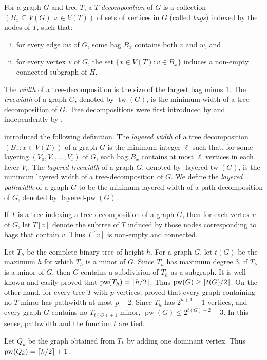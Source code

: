 \documentclass[a4paper,11pt]{article}
\newcommand{\ceil}[1]{\ensuremath{\protect\lceil#1\rceil}}
\DeclareMathOperator{\tw}{tw}
\DeclareMathOperator{\pw}{pw}
\DeclareMathOperator{\pb}{layered-pw}
\DeclareMathOperator{\tb}{layered-tw}
\theoremstyle{plain}
\theoremstyle{definition}
\begin{document}
For a graph $G$ and tree $T$, a $T$-\emph{decomposition} of  $G$ is a collection $(B_x\subseteq V(G):x\in V(T))$ of sets of vertices in $G$ (called  \emph{bags}) indexed by the nodes of $T$, such that:
\begin{enumerate}[(i)]
\item for every edge $vw$ of $G$, some bag $B_x$ contains both $v$ and $w$, and 
\item for every vertex $v$ of $G$, the set $\{x\in V(T):v\in B_x\}$ induces a non-empty connected subgraph of $H$.
\end{enumerate}
The \emph{width} of a tree-decomposition is the size of the largest bag minus 1. The \emph{treewidth} of a graph $G$, denoted by $\tw(G)$, is the minimum width of a tree decomposition of $G$. Tree decompositions were first introduced by \citet{Halin76} and independently by \citet{RS-II}. 

\citet{DMW17,DMW-FOCS13} introduced the following definition. The \emph{layered width} of a tree decomposition $(B_x:x\in V(T))$ of a graph $G$ is the minimum integer $\ell$ such that, for some layering $(V_0,V_1,\dots,V_t)$ of $G$, each bag $B_x$ contains at most $\ell$ vertices in each layer $V_i$. The \emph{layered treewidth} of a graph $G$, denoted by $\tb(G)$, is the minimum layered width of a tree-decomposition of $G$. We define the \emph{layered pathwidth} of a graph $G$ to be the minimum layered width of a path-decomposition of $G$, denoted by $\pb(G)$. 

If $T$ is a tree indexing a tree decomposition of a graph $G$, then for each vertex $v$ of $G$, let $T[v]$ denote the subtree of $T$ induced by those nodes corresponding to bags that contain $v$. Thus $T[v]$ is non-empty and connected. 

Let $T_h$ be the complete binary tree of height $h$. For a graph $G$, let $t(G)$ be the maximum $h$ for which $T_h$ is a minor of $G$. Since $T_h$ has maximum degree 3, if $T_h$ is a minor of $G$, then $G$ contains a subdivision of $T_h$ as a subgraph. It is well known and easily proved that  $\pw(T_h)=\ceil{h/2}$. Thus $\pw(G)\geq \ceil{t(G)/2}$. On the other hand, for every tree $T$ with $p$ vertices, \citet{BRST-JCTB91} proved that every graph containing no $T$ minor has pathwidth at most $p-2$. Since $T_h$ has $2^{h+1}-1$ vertices, and every graph $G$ contains no $T_{t(G)+1}$-minor, $\pw(G)\leq 2^{t(G)+2}-3$. In this sense, pathwidth and the function $t$ are tied. 

Let $Q_k$ be the graph obtained from $T_k$ by adding one dominant vertex. Thus $\pw(Q_k)=\ceil{k/2}+1$. 
\end{document}
